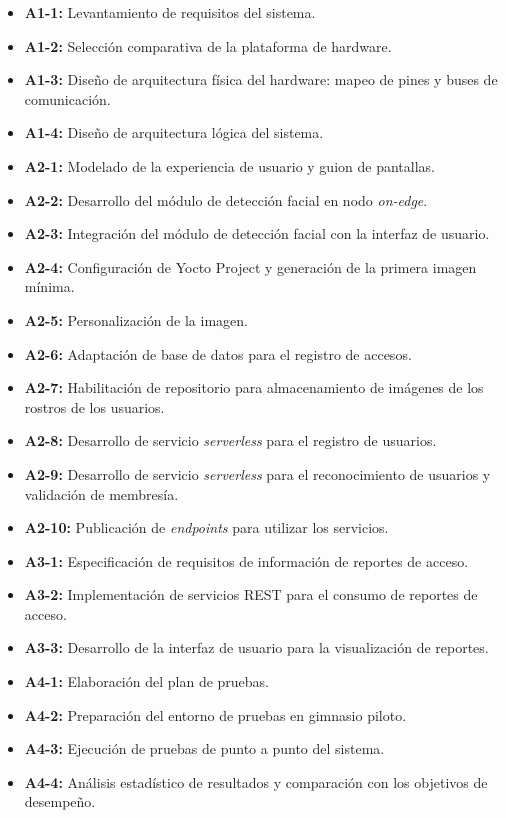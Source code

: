 \begin{itemize}
    \item \textbf{A1-1:} Levantamiento de requisitos del sistema.
    \item \textbf{A1-2:} Selección comparativa de la plataforma de hardware.
    \item \textbf{A1-3:} Diseño de arquitectura física del hardware: mapeo de pines y buses de comunicación.
    \item \textbf{A1-4:} Diseño de arquitectura lógica del sistema.
    \item \textbf{A2-1:} Modelado de la experiencia de usuario y guion de pantallas.
    \item \textbf{A2-2:} Desarrollo del módulo de detección facial en nodo \textit{on-edge}.
    \item \textbf{A2-3:} Integración del módulo de detección facial con la interfaz de usuario.
    \item \textbf{A2-4:} Configuración de Yocto Project y generación de la primera imagen mínima.
    \item \textbf{A2-5:} Personalización de la imagen.
    \item \textbf{A2-6:} Adaptación de base de datos para el registro de accesos.
    \item \textbf{A2-7:} Habilitación de repositorio para almacenamiento de imágenes de los rostros de los usuarios.
    \item \textbf{A2-8:} Desarrollo de servicio \textit{serverless} para el registro de usuarios.
    \item \textbf{A2-9:} Desarrollo de servicio \textit{serverless} para el reconocimiento de usuarios y validación de membresía.
    \item \textbf{A2-10:} Publicación de \textit{endpoints} para utilizar los servicios.
    \item \textbf{A3-1:} Especificación de requisitos de información de reportes de acceso.
    \item \textbf{A3-2:} Implementación de servicios REST para el consumo de reportes de acceso.
    \item \textbf{A3-3:} Desarrollo de la interfaz de usuario para la visualización de reportes.
    \item \textbf{A4-1:} Elaboración del plan de pruebas.
    \item \textbf{A4-2:} Preparación del entorno de pruebas en gimnasio piloto.
    \item \textbf{A4-3:} Ejecución de pruebas de punto a punto del sistema.
    \item \textbf{A4-4:} Análisis estadístico de resultados y comparación con los objetivos de desempeño.
\end{itemize}


